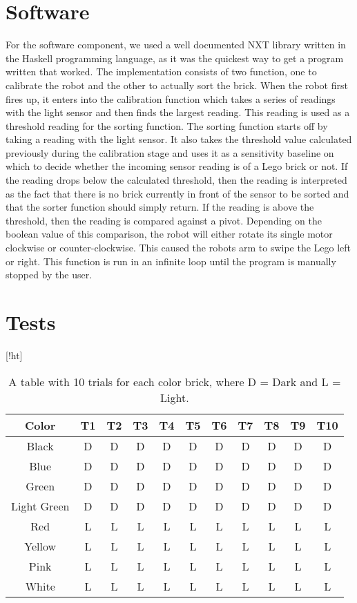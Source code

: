 \documentclass{article}
\begin{document}
\section{Software}
For the software component, we used a well documented NXT library written in the Haskell programming language, as it was the quickest way to get a program written that worked.
The implementation consists of two function, one to calibrate the robot and the other to actually sort the brick.
When the robot first fires up, it enters into the calibration function which takes a series of readings with the light sensor and then finds the largest reading.
This reading is used as a threshold reading for the sorting function.
The sorting function starts off by taking a reading with the light sensor.
It also takes the threshold value calculated previously during the calibration stage and uses it as a sensitivity baseline on which to decide whether the incoming sensor reading is of a Lego brick or not.
If the reading drops below the calculated threshold, then the reading is interpreted as the fact that there is no brick currently in front of the sensor to be sorted and that the sorter function should simply return.
If the reading is above the threshold, then the reading is compared against a pivot.
Depending on the boolean value of this comparison, the robot will either rotate its single motor clockwise or counter-clockwise.
This caused the robots arm to swipe the Lego left or right.
This function is run in an infinite loop until the program is manually stopped by the user.

\section{Tests}[!ht]
\begin{table}
  \begin{center}
    \begin{tabular}{| c | c | c | c | c | c | c | c | c | c | c |}
      \hline
      Color   & T1 & T2 & T3 & T4 & T5 & T6 & T7 & T8 & T9 & T10 \\
      \hline
      Black   &   D &  D  &  D  &  D  &  D  &  D  &  D  &  D  &  D  &  D   \\
      Blue    & D   &  D  &  D  &  D  &  D  &  D  &  D  &  D  &  D  &  D   \\
      Green   &  D  &  D  &  D  &  D  &  D  &  D  & D   &  D  & D   &  D   \\
 Light Green  &  D  & D   &  D  &  D  &  D  &  D  &  D  &  D  & D   &  D   \\
      Red     &  L  & L   &   L &  L  &  L  &  L  &  L  &  L  & L   &  L   \\
      Yellow  & L   &  L  & L   & L   &  L  & L   & L   &  L  & L   &  L   \\
      Pink    & L   &  L  & L   & L   & L   &  L  &  L  & L   & L   &  L   \\
      White   &  L  &  L  & L   & L   &  L  & L   &  L  &  L  &  L  &  L   \\
      \hline
    \end{tabular}
  \end{center}
  \caption{A table with 10 trials for each color brick, where D = Dark and L = Light.}
\end{table}
\end{document}
